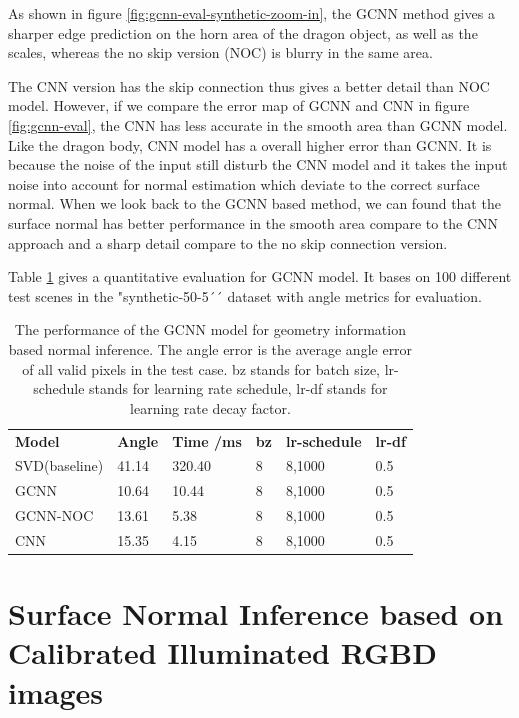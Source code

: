 \documentclass[border=15pt, multi, tikz]{article}
\newcommand{\tabhead}[1]{\textbf{#1}}
\begin{document}
As shown in figure \ref{fig:gcnn-eval-synthetic-zoom-in}, the GCNN method gives a sharper edge prediction on the horn area of the dragon object, as well as the scales, whereas the no skip version (NOC) is blurry in the same area.

The CNN version has the skip connection thus gives a better detail than NOC model. However, if we compare the error map of GCNN and CNN in figure \ref{fig:gcnn-eval}, the CNN has less accurate in the smooth area than GCNN model. Like the dragon body, CNN model has a overall higher error than GCNN. It is because the noise of the input still disturb the CNN model and it takes the input noise into account for normal estimation which deviate to the correct surface normal. When we look back to the GCNN based method, we can found that the surface normal has better performance in the smooth area compare to the CNN approach and a sharp detail compare to the no skip connection version.

Table \ref{tab:gcnn-eval} gives a quantitative evaluation for GCNN model. It bases on 100 different test scenes in the "synthetic-50-5´´ dataset with angle metrics for evaluation.



\begin{table}[H]
	
	\centering
	\begin{tabular}{l l l l l l }
		\tabhead{Model} & \tabhead{Angle} & \tabhead{Time /ms} & \tabhead{bz} & \tabhead{lr-schedule} & \tabhead{lr-df}\\
		SVD(baseline)  & 41.14  & 320.40 & 8 & 8,1000 & 0.5\\ 
		\hline
		GCNN  & 10.64  & 10.44 & 8 & 8,1000 & 0.5\\ 
		\hline
		GCNN-NOC & 13.61 & 5.38 & 8 & 8,1000 & 0.5\\
		\hline
		CNN & 15.35 & 4.15 & 8 & 8,1000 & 0.5\\
	\end{tabular}
	\caption{The performance of the GCNN model for geometry information based normal inference. The angle error is the average angle error of all valid pixels in the test case. bz stands for batch size, lr-schedule stands for learning rate schedule, lr-df stands for learning rate decay factor.}	
	\label{tab:gcnn-eval}
\end{table}





\newpage
\section{Surface Normal Inference based on Calibrated Illuminated RGBD images }
\end{document}
